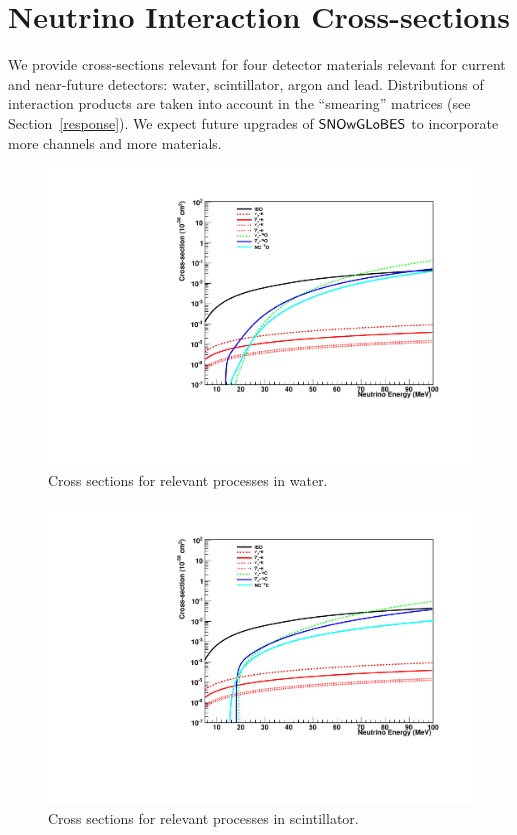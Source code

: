 \documentclass[12pt]{article}
\newcommand{\snowglobes}{\sf{SNOwGLoBES}}
\begin{document}
\section{Neutrino Interaction Cross-sections}

We provide cross-sections relevant for four detector materials relevant for current and near-future detectors:
water, scintillator, argon and lead.  Distributions of interaction
products are taken into account in the ``smearing'' matrices (see Section~\ref{response}).  We
expect future upgrades of $\snowglobes$ to incorporate more channels and
more materials.

\begin{figure}[htb]
  \centering\includegraphics[width=.75\textwidth]{xscns_water.pdf}
  \caption{Cross sections for relevant processes in water.}
  \label{fig:water_xscns}
\end{figure}

\begin{figure}[htb]
  \centering\includegraphics[width=.75\textwidth]{xscns_scint.pdf}
  \caption{Cross sections for relevant processes in scintillator.}
  \label{fig:scint_xscns}
\end{figure}
\end{document}
